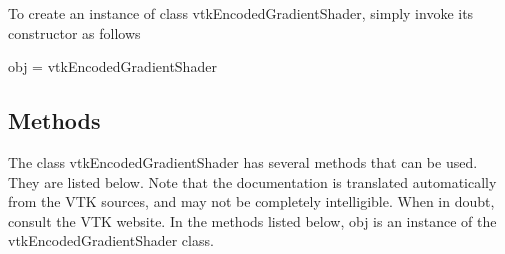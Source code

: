 To create an instance of class vtk\-Encoded\-Gradient\-Shader, simply invoke its constructor as follows \begin{DoxyVerb}  obj = vtkEncodedGradientShader
\end{DoxyVerb}
 \hypertarget{vtkwidgets_vtkxyplotwidget_Methods}{}\subsection{Methods}\label{vtkwidgets_vtkxyplotwidget_Methods}
The class vtk\-Encoded\-Gradient\-Shader has several methods that can be used. They are listed below. Note that the documentation is translated automatically from the V\-T\-K sources, and may not be completely intelligible. When in doubt, consult the V\-T\-K website. In the methods listed below, {\ttfamily obj} is an instance of the vtk\-Encoded\-Gradient\-Shader class. 
